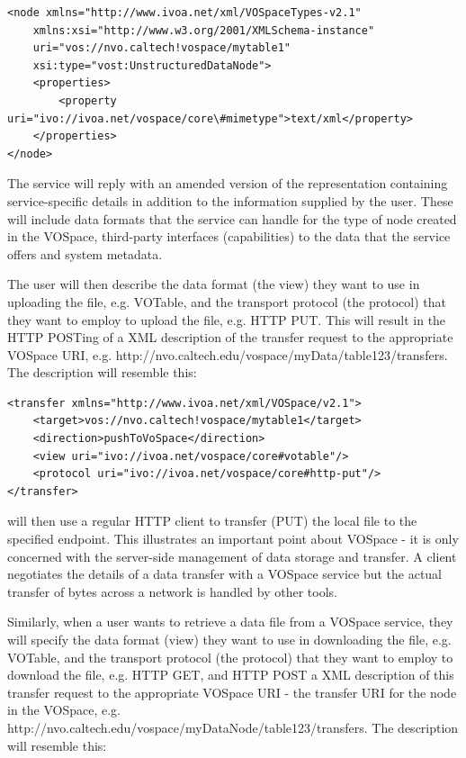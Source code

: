 \documentclass[11pt,a4paper]{ivoa}
\begin{document}
\begin{lstlisting}
<node xmlns="http://www.ivoa.net/xml/VOSpaceTypes-v2.1"
    xmlns:xsi="http://www.w3.org/2001/XMLSchema-instance" 
    uri="vos://nvo.caltech!vospace/mytable1"
    xsi:type="vost:UnstructuredDataNode">  
    <properties> 
        <property uri="ivo://ivoa.net/vospace/core\#mimetype">text/xml</property>     
    </properties> 
</node> 
\end{lstlisting}

The service will reply with an amended version of the representation containing service-specific details in addition to the information supplied by the user. These will include data formats that the service can handle for the type of node created in the VOSpace, third-party interfaces (capabilities) to the data that the service offers and system metadata.

The user will then describe the data format (the view) they want to use in uploading the file, e.g. VOTable, and the transport protocol (the protocol) that they want to employ to upload the file, e.g. HTTP PUT. This will result in the HTTP POSTing of a XML description of the transfer request to the appropriate VOSpace URI, e.g. http://nvo.caltech.edu/vospace/myData/table123/transfers. The description will resemble this:

\begin{lstlisting}
<transfer xmlns="http://www.ivoa.net/xml/VOSpace/v2.1">
    <target>vos://nvo.caltech!vospace/mytable1</target>
    <direction>pushToVoSpace</direction> 
    <view uri="ivo://ivoa.net/vospace/core#votable"/> 
    <protocol uri="ivo://ivoa.net/vospace/core#http-put"/>  
</transfer>
\end{lstlisting}

will then use a regular HTTP client to transfer (PUT) the local file to the specified endpoint. This illustrates an important point about VOSpace - it is only concerned with the server-side management of data storage and transfer. A client negotiates the details of a data transfer with a VOSpace service but the actual transfer of bytes across a network is handled by other tools.

Similarly, when a user wants to retrieve a data file from a VOSpace service, they will specify the data format (view) they want to use in downloading the file, e.g. VOTable, and the transport protocol (the protocol) that they want to employ to download the file, e.g. HTTP GET, and HTTP POST a XML description of this transfer request to the appropriate VOSpace URI - the transfer URI for the node in the VOSpace, e.g. http://nvo.caltech.edu/vospace/myDataNode/table123/transfers. The description will resemble this:
\end{document}
